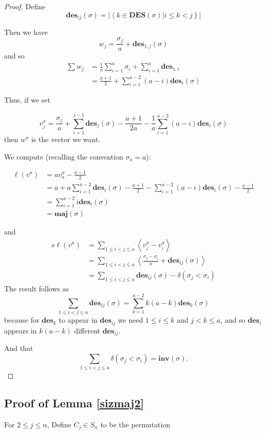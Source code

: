 \documentclass{amsart}[12pt]
\theoremstyle{definition}
\newcommand{\sk}{s\ell}
\newcommand{\inv}{\mathbf{inv}}
\newcommand{\DES}{\mathbf{DES}}
\newcommand{\des}{\mathbf{des}}
\newcommand{\maj}{\mathbf{maj}}
\begin{document}
\begin{proof}
Define $$\des_{ij}(\sigma)=\left|\left\langle k\in\DES(\sigma)\big| i\leq k < j\right\}\right|$$

Then we have $$w_j=\frac{\sigma_j}{a}+\des_{1,j}(\sigma)$$
and so
\begin{align*}
\sum w_j &=\frac{1}{a}\sum_{i=1}^a \sigma_i +\sum_{i=1}^a \des_{1,i} \\
 &=\frac{a+1}{2}+\sum_{i=1}^{a-2} (a-i)\des_i(\sigma)
\end{align*}

Thus, if we set

$$v^\sigma_j=\frac{\sigma_j}{a}+\sum_{i=1}^{j-1} \des_j(\sigma)-\frac{a+1}{2a}-\frac{1}{a}\sum_{i=1}^{a-2} (a-i)\des_i(\sigma)$$
then $w^\sigma$ is the vector we want.

We compute (recalling the convention $\sigma_a=a$):

\begin{align*}
\ell(v^\sigma) &= a v^\sigma_a-\frac{a-1}{2} \\
&=a+a\sum_{i=1}^{a-2} \des_i(\sigma)-\frac{a+1}{2}-\sum_{i=1}^{a-2} (a-i)\des_i(\sigma)-\frac{a-1}{2} \\
&=\sum_{i=1}^{a-2} i\des_i(\sigma) \\
&=\maj(\sigma)
\end{align*}

and
\begin{align*}
\sk (v^\sigma) &=\sum_{1\leq i <j \leq a} \left\langle v^\sigma_j-v^\sigma_i\right\rangle \\
&=\sum_{1\leq i <j \leq a} \left\langle\frac{\sigma_j-\sigma_i}{a}+\des_{ij}(\sigma)\right\rangle \\
&=\sum_{1\leq i<j\leq a} \des_{ij}(\sigma)-\delta(\sigma_j<\sigma_i)
\end{align*}
The result follows as
$$\sum_{1\leq i<j\leq a} \des_{ij}(\sigma)=\sum_{k=1}^{a-2} k(a-k)\des_k(\sigma)$$
because for $\des_k$ to appear in $\des_{ij}$ we need $1\leq i\leq k$ and $j<k\leq a$, and so $\des_i$ appears in $k(a-k)$ different $\des_{ij}$.

And that $$\sum_{1\leq i<j\leq a} \delta(\sigma_j<\sigma_i)=\inv(\sigma).$$  



\end{proof}

\subsection{Proof of Lemma \ref{sizmaj2}}

For $2\leq j\leq n$, Define $C_j\in S_n$ to be the permutation 
\end{document}
